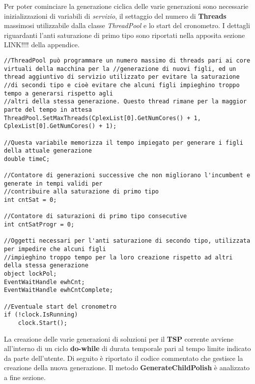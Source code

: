 \documentclass[11pt]{article}
\begin{document}
Per poter cominciare la generazione ciclica delle varie generazioni sono necessarie inizializzazioni di variabili di \textit{servizio}, il settaggio del numero di \textbf{Threads} massimosi utilizzabile dalla classe \textit{ThreadPool} e lo start del cronometro. I dettagli riguardanti l'anti saturazione di primo tipo sono riportati nella apposita sezione LINK!!!! della appendice.

\begin{lstlisting}
//ThreadPool può programmare un numero massimo di threads pari ai core virtuali della macchina per la //generazione di nuovi figli, ed un thread aggiuntivo di servizio utilizzato per evitare la saturazione
//di secondi tipo e cioè evitare che alcuni figli impieghino troppo tempo a generarsi rispetto agli
//altri della stessa generazione. Questo thread rimane per la maggior parte del tempo in attesa
ThreadPool.SetMaxThreads(CplexList[0].GetNumCores() + 1, CplexList[0].GetNumCores() + 1);

//Questa variabile memorizza il tempo impiegato per generare i figli della attuale generazione
double timeC;

//Contatore di generazioni successive che non migliorano l'incumbent e generate in tempi validi per
//contribuire alla saturazione di primo tipo
int cntSat = 0;

//Contatore di saturazioni di primo tipo consecutive
int cntSatProgr = 0;

//Oggetti necessari per l'anti saturazione di secondo tipo, utilizzata per impedire che alcuni figli
//impieghino troppo tempo per la loro creazione rispetto ad altri della stessa generazione
object lockPol;
EventWaitHandle ewhCnt;
EventWaitHandle ewhCntComplete;

//Eventuale start del cronometro
if (!clock.IsRunning)
    clock.Start();
\end{lstlisting}

La creazione delle varie generazioni di soluzioni per il \textbf{TSP} corrente avviene all'interno di un ciclo \textbf{do-while} di durata temporale pari al tempo limite indicato da parte dell'utente. Di seguito è riportato il codice commentato che gestisce la creazione della nuova generazione. Il metodo \textbf{GenerateChildPolish} è analizzato a fine sezione.
\end{document}
